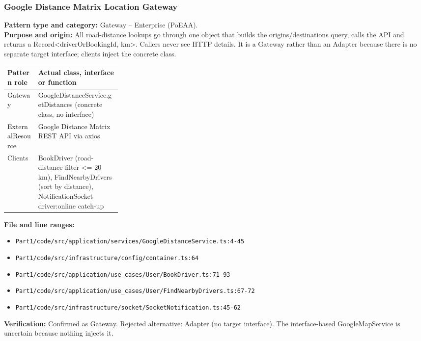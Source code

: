 \documentclass[11pt,a4paper]{article}
\begin{document}
\subsubsection*{Google Distance Matrix Location Gateway}
\textbf{Pattern type and category:} Gateway -- Enterprise (PoEAA).\\
\textbf{Purpose and origin:} All road-distance lookups go through one object that builds the origins/destinations query, calls the API and returns a Record\textless{}driverOrBookingId, km\textgreater{}. Callers never see HTTP details. It is a Gateway rather than an Adapter because there is no separate target interface; clients inject the concrete class.

\noindent\begin{tabularx}{\linewidth}{@{}P{0.27\linewidth}Y@{}}
\toprule Pattern role & Actual class, interface or function \\ \midrule
Gateway & GoogleDistanceService.getDistances (concrete class, no interface) \\
ExternalResource & Google Distance Matrix REST API via axios \\
Clients & BookDriver (road-distance filter \textless{}= 20 km), FindNearbyDrivers (sort by distance), NotificationSocket driver:online catch-up \\
\bottomrule
\end{tabularx}

\noindent\textbf{File and line ranges:}\begin{itemize}\setlength\itemsep{0pt}\item \texttt{Part1/\allowbreak{}code/\allowbreak{}src/\allowbreak{}application/\allowbreak{}services/\allowbreak{}GoogleDistanceService.\allowbreak{}ts:4-45}\item \texttt{Part1/\allowbreak{}code/\allowbreak{}src/\allowbreak{}infrastructure/\allowbreak{}config/\allowbreak{}container.\allowbreak{}ts:64}\item \texttt{Part1/\allowbreak{}code/\allowbreak{}src/\allowbreak{}application/\allowbreak{}use\_\allowbreak{}cases/\allowbreak{}User/\allowbreak{}BookDriver.\allowbreak{}ts:71-93}\item \texttt{Part1/\allowbreak{}code/\allowbreak{}src/\allowbreak{}application/\allowbreak{}use\_\allowbreak{}cases/\allowbreak{}User/\allowbreak{}FindNearbyDrivers.\allowbreak{}ts:67-72}\item \texttt{Part1/\allowbreak{}code/\allowbreak{}src/\allowbreak{}infrastructure/\allowbreak{}socket/\allowbreak{}SocketNotification.\allowbreak{}ts:45-62}\end{itemize}
\noindent\textbf{Verification:} Confirmed as Gateway. Rejected alternative: Adapter (no target interface). The interface-based GoogleMapService is uncertain because nothing injects it.
\end{document}

